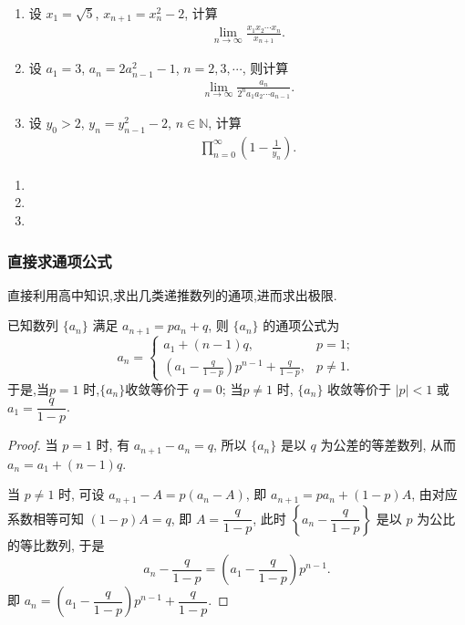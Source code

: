 \documentclass[../../main.tex]{subfiles}
\begin{document}
\begin{example}
\begin{enumerate}
\item 设 $x_1 = \sqrt{5}$, $x_{n+1} = x_n^2 - 2$, 计算
\begin{align*}
\lim_{n \to \infty} \frac{x_1 x_2 \cdots x_n}{x_{n+1}}.
\end{align*}
\item 设 $a_1 = 3$, $a_n = 2a_{n-1}^2 - 1$, $n = 2, 3, \cdots$, 则计算
\begin{align*}
\lim_{n \to \infty} \frac{a_n}{2^n a_1 a_2 \cdots a_{n-1}}.
\end{align*}
\item 设 $y_0 > 2$, $y_n = y_{n-1}^2 - 2$, $n \in \mathbb{N}$, 计算
\begin{align*}
\prod_{n=0}^{\infty} \left(1 - \frac{1}{y_n}\right).
\end{align*}
\end{enumerate}
\end{example}
\begin{solution}
\begin{enumerate}
\item 

\item 

\item 
\end{enumerate}

\end{solution}


\subsubsection{直接求通项公式}

直接利用高中知识,求出几类递推数列的通项,进而求出极限.

\begin{proposition}\label{proposition:可直接求通项--类型一}
已知数列 $\{a_n\}$ 满足 $a_{n+1} = p a_n + q$, 则 $\{a_n\}$ 的通项公式为
\[
a_n = 
\begin{cases} 
a_1 + (n - 1)q, & p = 1; \\
\displaystyle \left( a_1 - \frac{q}{1 - p} \right) p^{n - 1} + \frac{q}{1 - p}, & p \neq 1.
\end{cases}
\]
于是,当$p = 1$ 时,$\{a_n\}$收敛等价于 $q = 0$;
当$p \neq 1$ 时, $\{a_n\}$ 收敛等价于 $|p| < 1$ 或 $a_1 = \dfrac{q}{1 - p}$.
\end{proposition}
\begin{proof}
当 $p = 1$ 时, 有 $a_{n + 1} - a_n = q$, 所以 $\{a_n\}$ 是以 $q$ 为公差的等差数列, 从而 $a_n = a_1 + (n - 1)q$.

当 $p \neq 1$ 时, 可设 $a_{n + 1} - A = p(a_n - A)$, 即 $a_{n + 1} = p a_n + (1 - p)A$, 由对应系数相等可知 $(1 - p)A = q$, 即 $A = \dfrac{q}{1 - p}$, 此时 $\left\{ a_n - \dfrac{q}{1 - p} \right\}$ 是以 $p$ 为公比的等比数列, 于是
\[
a_n - \frac{q}{1 - p} = \left( a_1 - \frac{q}{1 - p} \right) p^{n - 1}.
\]
即 $a_n = \left( a_1 - \dfrac{q}{1 - p} \right) p^{n - 1} + \dfrac{q}{1 - p}$. 

\end{proof}
\end{document}
